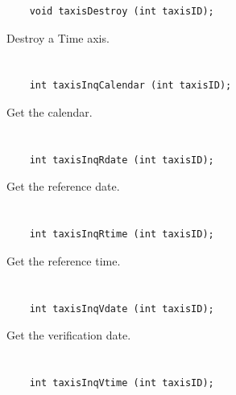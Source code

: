 \begin{verbatim}
    void taxisDestroy (int taxisID);
\end{verbatim}

Destroy a Time axis.


\section*{\tt {}}

\begin{verbatim}
    int taxisInqCalendar (int taxisID);
\end{verbatim}

Get the calendar.


\section*{\tt {}}

\begin{verbatim}
    int taxisInqRdate (int taxisID);
\end{verbatim}

Get the reference date.


\section*{\tt {}}

\begin{verbatim}
    int taxisInqRtime (int taxisID);
\end{verbatim}

Get the reference time.


\section*{\tt {}}

\begin{verbatim}
    int taxisInqVdate (int taxisID);
\end{verbatim}

Get the verification date.


\section*{\tt {}}

\begin{verbatim}
    int taxisInqVtime (int taxisID);
\end{verbatim}

